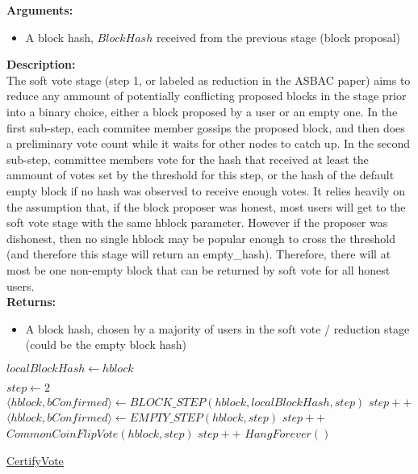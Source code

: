 \documentclass[10pt,a4paper]{article}
\begin{document}
\noindent \textbf{Arguments:}
\begin{itemize}
    \item A block hash, $BlockHash$ received from the previous stage (block proposal)
  \end{itemize}

\noindent \textbf{Description:}\\
The soft vote stage (step 1, or labeled as reduction in the ASBAC paper) aims to reduce any ammount of potentially conflicting proposed blocks in the stage prior into a binary choice, either a block proposed by a user or an empty one.
In the first sub-step, each commitee member gossips the proposed block, and then does a preliminary vote count while it waits for other nodes to catch up.
In the second sub-step, committee members vote for the hash that received at least the ammount of votes set by the threshold for this step, or the hash of the default empty block if no hash was observed to receive enough votes.
It relies heavily on the assumption that, if the block proposer was honest, most users will get to the soft vote stage with the same hblock parameter.
However if the proposer was dishonest, then no single hblock may be popular enough to cross the threshold (and therefore this stage will return an empty\_hash).
Therefore, there will at most be one non-empty block that can be returned by soft vote for all honest users.\\

\noindent \textbf{Returns:}
\begin{itemize}
    \item A block hash, chosen by a majority of users in the soft vote / reduction stage 
    (could be the empty block hash)
  \end{itemize}

\begin{algorithm}
    \begin{algorithmic}[H]
    \State $localBlockHash \gets hblock$

    \State $step \gets 2$
        \\
        \State $\langle hblock, bConfirmed \rangle \gets BLOCK\_STEP(hblock, localBlockHash, step)$
        \EndIf
        \State $step++$\\
   
        \State $ \langle hblock, bConfirmed \rangle \gets EMPTY\_STEP(hblock,step)$
        \EndIf
        \State $step++$\\

        \State $CommonCoinFlipVote(hblock, step)$
        \State $step++$
    \EndWhile
    \State $HangForever()$
    \EndFunction
    \end{algorithmic}
    \caption{\underline{CertifyVote}}
\end{algorithm}
\end{document}
